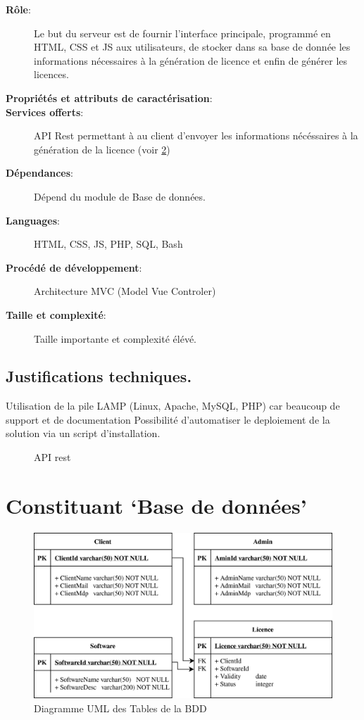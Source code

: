 \begin{description}
	\item[\textbf{Rôle}:]
				Le but du serveur est de fournir l'interface principale, programmé 
				en HTML, CSS et JS aux utilisateurs, de stocker dans sa base de donnée
				les informations nécessaires à la génération de licence et enfin de générer 
				les licences.
	\item[\textbf{Propriétés et attributs de caractérisation}:]
	\item[\textbf{Services offerts}:]
				API Rest \cite{REST} permettant à au client d'envoyer les informations
				nécéssaires à la génération de la licence (voir \ref{fig:fig2})				
	\item[\textbf{Dépendances}:]
				Dépend du module de Base de données.
	\item[\textbf{Languages}:]
				HTML, CSS, JS, PHP, SQL, Bash 
	\item[\textbf{Procédé de développement}:]
				Architecture MVC (Model Vue Controler)
	\item[\textbf{Taille et complexité}:]
				Taille importante et complexité élévé.
\end{description}

\subsection{Justifications techniques.}
Utilisation de la pile LAMP (Linux, Apache, MySQL, PHP) car beaucoup de 
support et de documentation \cite{LAMP} \newline
Possibilité d'automatiser le deploiement de la solution via un script d'installation.

\begin{figure}[hp!]
	\caption{API rest}
	
	\label{fig:fig2}
\end{figure}
\newpage

\section{Constituant `Base de données'}

\begin{figure}[h!]
	\centering
	\includegraphics[width=\textwidth]{../png/SQL_table.png}
	\caption{Diagramme UML des Tables de la BDD}
	\label{fig:fig2}
\end{figure}

